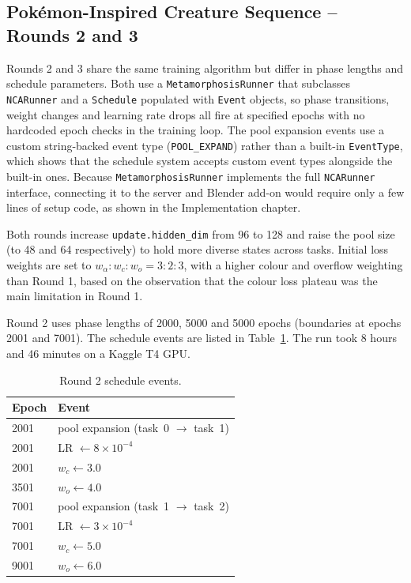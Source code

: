 \subsection{Pokémon-Inspired Creature Sequence -- Rounds 2 and 3}

Rounds 2 and 3 share the same training algorithm but differ in phase lengths
and schedule parameters. Both use a \texttt{MetamorphosisRunner} that
subclasses \texttt{NCARunner} and a \texttt{Schedule} populated with
\texttt{Event} objects, so phase transitions, weight changes and learning rate
drops all fire at specified epochs with no hardcoded epoch checks in the
training loop. The pool expansion events use a custom string-backed event
type (\texttt{POOL\_EXPAND}) rather than a built-in \texttt{EventType}, which shows 
that the schedule system accepts custom event types alongside the built-in ones. 
Because \texttt{MetamorphosisRunner} implements the full \texttt{NCARunner} 
interface, connecting it to the server and Blender add-on would require only a few 
lines of setup code, as shown in the Implementation chapter.

Both rounds increase \texttt{update.hidden\_dim} from 96 to 128 and raise the
pool size (to 48 and 64 respectively) to hold more diverse states across tasks.
Initial loss weights are set to $w_{\alpha}:w_c:w_o = 3{:}2{:}3$, with a
higher colour and overflow weighting than Round 1, based on the observation
that the colour loss plateau was the main limitation in Round 1.

Round 2 uses phase lengths of 2000, 5000 and 5000 epochs (boundaries at
epochs 2001 and 7001). The schedule events are listed in
Table~\ref{tab:exp-meta-r2-schedule}. The run took 8 hours and 46 minutes on
a Kaggle T4 GPU.

\begin{table}[htbp]
    \centering
    \small
    {\setlength{\tabcolsep}{4pt}
    \begin{tabular}{@{}p{}p{}@{}}
        \hline
        \textbf{Epoch} & \textbf{Event}\\
        \hline
        2001 & pool expansion (task~0 $\rightarrow$ task~1)\\
        2001 & LR $\leftarrow 8\times10^{-4}$\\
        2001 & $w_c \leftarrow 3.0$\\
        3501 & $w_o \leftarrow 4.0$\\
        7001 & pool expansion (task~1 $\rightarrow$ task~2)\\
        7001 & LR $\leftarrow 3\times10^{-4}$\\
        7001 & $w_c \leftarrow 5.0$\\
        9001 & $w_o \leftarrow 6.0$\\
        \hline
    \end{tabular}}
    \caption{Round 2 schedule events.}
    \label{tab:exp-meta-r2-schedule}
\end{table}

